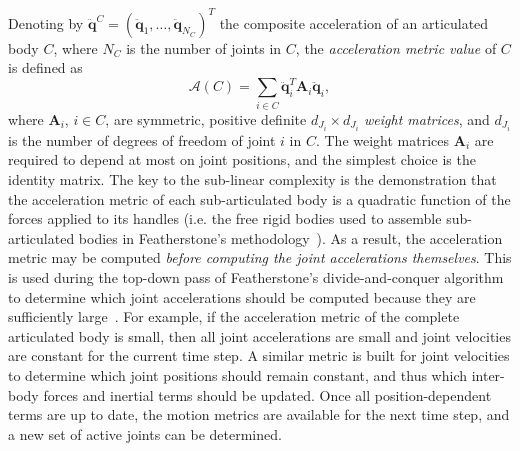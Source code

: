 Denoting by $\mathbf{\ddot{q}}^C=(\mathbf{\ddot{q}}_1,\ldots,\mathbf{\ddot{q}}_{N_C})^T$
the composite acceleration of an articulated body $C$, where $N_C$ is the number of joints in $C$, the \emph{acceleration
metric value} of $C$ is defined as
\[\mathcal{A}(C)=\sum_{i\in C}\mathbf{\ddot{q}}_i^T\mathbf{A}_i\mathbf{\ddot{q}}_i,\] where $\mathbf{A}_i$, $i\in C$, are symmetric, positive definite $d_{J_i}\times d_{J_i}$ \emph{weight matrices}, and $d_{J_i}$ is
the number of degrees of freedom of joint $i$ in $C$. The weight matrices $\mathbf{A}_i$ are required to depend at most on joint positions, and the simplest choice is the identity
matrix. The key to the sub-linear complexity is the demonstration that the acceleration metric of each sub-articulated body is a quadratic function of the forces applied to its handles (i.e. the free rigid bodies used to assemble sub-articulated bodies in Featherstone's methodology~\cite{Redon2005}). As a result, the acceleration metric may be computed \emph{before computing the joint accelerations themselves}. This is used during the top-down pass of Featherstone's divide-and-conquer algorithm to determine which joint accelerations should be computed because they are sufficiently large~\cite{Redon2005}. For example, if the acceleration metric of the complete articulated body is small, then all joint accelerations are small and joint velocities are constant for the current time step. A similar metric is built for joint velocities to determine which joint positions should remain constant, and thus which inter-body forces and inertial terms should be updated. Once all position-dependent terms are up to date, the motion metrics are available for the next time step, and a new set of active joints can be determined.

